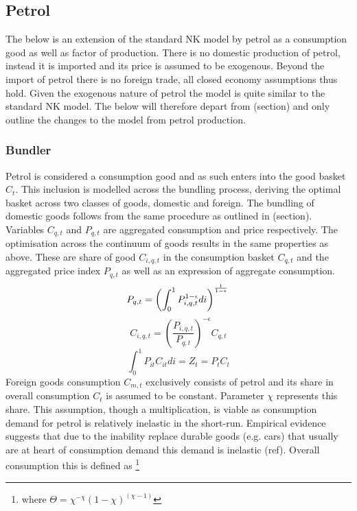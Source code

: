 \documentclass[12pt,a4paper,english]{article} %
\begin{document}

	\subsection{Petrol}
	The below is an extension of the standard NK model by petrol as a consumption good as well as factor of production. There is no domestic production of petrol, instead it is imported and its price is assumed to be exogenous. Beyond the import of petrol there is no foreign trade, all closed economy assumptions thus hold. 
	Given the exogenous nature of petrol the model is quite similar to the standard NK model. The below will therefore depart from (section) and only outline the changes to the model from petrol production. 	
	
	\subsubsection{Bundler}
	Petrol is considered a consumption good and as such enters into the good basket $C_t$. This inclusion is modelled across the bundling process, deriving the optimal basket across two classes of goods, domestic and foreign. 
	The bundling of domestic goods follows from the same procedure as outlined in (section). Variables $C_{q,t}$ and $P_{q,t}$ are aggregated consumption and price respectively. The optimisation across the continuum of goods results in the same properties as above. These are share of good $C_{i,q,t}$ in the consumption basket $C_{q,t}$ and the aggregated price index $P_{q,t}$ as well as an expression of aggregate consumption. \\
	\begin{equation} \label{eq:o_pindex}
		P_{q,t} = \left( \int_{0}^{1} P_{i,q,t}^{1 - \epsilon} di \right)^{\frac{1}{1-\epsilon}} \\
	\end{equation}
	\begin{equation} \label{eq:o_cshare}
		C_{i,q,t} = \left( \frac{P_{i,q,t}}{P_{q,t}} \right)^{-\epsilon} C_{q,t}
	\end{equation}
	\begin{equation} \label{eq:o_pcon}
		\int_{0}^{1} P_{it} C_{it} di = Z_t = P_t C_t
	\end{equation}
	Foreign goods consumption $C_{m,t}$ exclusively consists of petrol and its share in overall consumption $C_t$ is assumed to be constant. Parameter $\chi$ represents this share. 
	This assumption, though a multiplication, is viable as consumption demand for petrol is relatively inelastic in the short-run. Empirical evidence suggests that due to the inability replace durable goods (e.g. cars) that usually are at heart of consumption demand this demand is inelastic (ref). Overall consumption this is defined as \footnote{where $\Theta = \chi^{-\chi}(1-\chi)^{(\chi-1)}$}
\end{document}
